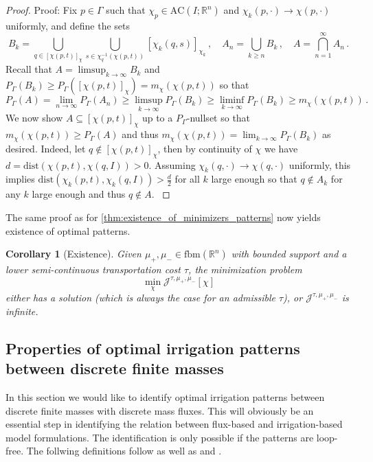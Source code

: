 \documentclass[10pt,a4paper,oneside,final]{article}
\newcommand{\R}{{\mathbb{R}}}
\newcommand{\dist}{{\mathrm{dist}}}
\newcommand{\fbm}{{\mathrm{fbm}}}
\newcommand{\AC}{\mathrm{AC}}
\newcommand{\reSpace}{\Gamma}
\newcommand{\reMeasure}{P_{\reSpace}}
\newcommand{\JEn}{{\mathcal{J}}}
\newcommand{\transportPaths}{mass fluxes}
\numberwithin{equation}{section}
\theoremstyle{plain}
\newtheorem{corollary}[theorem]{Corollary}
\theoremstyle{definition}
\theoremstyle{remark}
\begin{document}
{\begin{proof}
{Proof:
Fix $p \in \reSpace$ such that $\chi_p \in \AC(I;\R^n)$ and $\chi_k(p,\cdot)\to\chi(p,\cdot)$ uniformly, %
and define the sets
\begin{displaymath}
B_k=\bigcup_{q\in[\chi(p,t)]_\chi}\bigcup_{s\in\chi_q^{-1}(\chi(p,t))}[\chi_k(q,s)]_{\chi_k}\,,\quad
A_n=\bigcup_{k \geq n}B_k\,,\quad
A=\bigcap_{n=1}^\infty A_n\,.
\end{displaymath}
Recall that $A = \limsup_{k\to\infty}B_k$ and $\reMeasure(B_k)\geq\reMeasure([\chi(p,t)]_\chi)=m_{\chi}(\chi(p,t))$ so that
\begin{displaymath}
 \reMeasure(A) = \lim_{n\to\infty}\reMeasure(A_n) \geq \limsup_{k\to\infty}\reMeasure(B_k) \geq \liminf_{k\to\infty}\reMeasure(B_k) \geq m_{\chi}(\chi(p,t))\,.
\end{displaymath}
We now show $A \subseteq [\chi(p,t)]_{\chi}$ up to a $\reMeasure$-nullset so that $m_\chi(\chi(p,t)) \geq \reMeasure(A)$ and thus $m_\chi(\chi(p,t))=\lim_{k\to\infty}\reMeasure(B_k)$ as desired.
Indeed, let $q \notin[\chi(p,t)]_{\chi}$, then by continuity of $\chi$ we have $d=\dist(\chi(p,t),\chi(q,I)) > 0$.
Assuming $\chi_k(q,\cdot) \to \chi(q,\cdot)$ uniformly, this implies $\dist(\chi_k(p,t),\chi_k(q,I)) > \frac d2$ for all $k$ large enough
so that $q\notin A_k$ for any $k$ large enough and thus $q\notin A$.
}
\end{proof}

The same proof as for \cref{thm:existence_of_minimizers_patterns} now yields existence of optimal patterns.

\begin{corollary}[Existence]
Given $\mu_+,\mu_-\in\fbm(\R^n)$ with bounded support and a lower semi-continuous transportation cost $\tau$, the minimization problem
\begin{displaymath}
 \min_\chi \JEn^{\tau,\mu_+,\mu_-}[\chi]
\end{displaymath}
either has a solution (which is always the case for an admissible $\tau$), or $\JEn^{\tau,\mu_+,\mu_-}$ is infinite.
\end{corollary}


\subsection{Properties of optimal irrigation patterns between discrete finite masses}
In this section we would like to identify optimal irrigation patterns between discrete finite masses with discrete \transportPaths{}.
This will obviously be an essential step in identifying the relation between flux-based and irrigation-based model formulations.
The identification is only possible if the patterns are loop-free.
The follwing definitions follow \cite[Def.\,4.5]{Maddalena-Solimini-Synchronic} as well as \cite[Def.\,3.3]{Bernot-Caselles-Morel-Structure-Branched} and \cite[Def.\,7.3]{BeCaMo09}.

}
\end{document}
